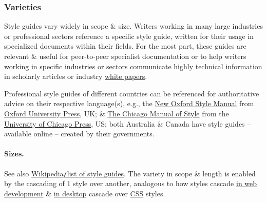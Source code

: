 \documentclass{article}
\begin{document}
\subsubsection{Varieties}
Style guides vary widely in scope \& size. Writers working in many large industries or professional sectors reference a specific style guide, written for their usage in specialized documents within their fields. For the most part, these guides are relevant \& useful for peer-to-peer specialist documentation or to help writers working in specific industries or sectors communicate highly technical information in scholarly articles or industry \href{https://en.wikipedia.org/wiki/White_paper}{white papers}.

Professional style guides of different countries can be referenced for authoritative advice on their respective language(s), e.g., the \href{https://en.wikipedia.org/wiki/New_Oxford_Style_Manual}{New Oxford Style Manual} from \href{https://en.wikipedia.org/wiki/Oxford_University_Press}{Oxford University Press}, UK; \& \href{https://en.wikipedia.org/wiki/The_Chicago_Manual_of_Style}{The Chicago Manual of Style} from the \href{https://en.wikipedia.org/wiki/University_of_Chicago_Press}{University of Chicago Press}, US; both Australia \& Canada have style guides -- available online -- created by their governments.

\paragraph{Sizes.} See also \href{https://en.wikipedia.org/wiki/List_of_style_guides}{Wikipedia{\tt/}list of style guides}. The variety in scope \& length is enabled by the cascading of 1 style over another, analogous to how styles cascade \href{https://en.wikipedia.org/wiki/Style_sheet_(web_development)}{in web development} \& \href{https://en.wikipedia.org/wiki/Style_sheet_(desktop_publishing)}{in desktop} cascade over \href{https://en.wikipedia.org/wiki/CSS}{CSS} styles.
\end{document}
